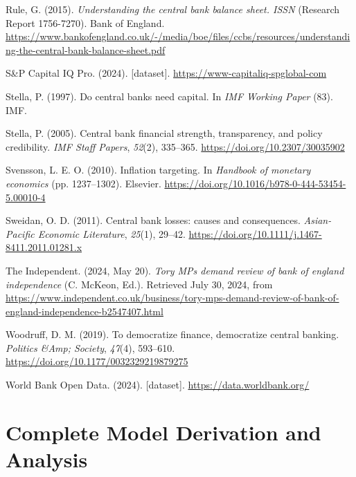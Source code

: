 \documentclass[
  a4paper,
  abstract=true]{scrartcl}
\newlength{\cslhangindent}
\newenvironment{CSLReferences}[2] %
 {\begin{list}{}{%
  \setlength{\itemindent}{0pt}
  \setlength{\leftmargin}{0pt}
  \setlength{\parsep}{0pt}
  \ifodd #1
   \setlength{\leftmargin}{\cslhangindent}
   \setlength{\itemindent}{-1\cslhangindent}
  \fi
  \setlength{\itemsep}{#2\baselineskip}}}
 {\end{list}}
\theoremstyle{definition}
\begin{document}
\begin{CSLReferences}{1}{0}
Rule, G. (2015). \emph{Understanding the central bank balance sheet.
ISSN} (Research Report 1756-7270). Bank of England.
\url{https://www.bankofengland.co.uk/-/media/boe/files/ccbs/resources/understanding-the-central-bank-balance-sheet.pdf}

S\&P Capital IQ Pro. (2024). {[}dataset{]}.
\url{https://www-capitaliq-spglobal-com}

Stella, P. (1997). Do central banks need capital. In \emph{IMF Working
Paper} (83). IMF.

Stella, P. (2005). Central bank financial strength, transparency, and
policy credibility. \emph{IMF Staff Papers}, \emph{52}(2), 335--365.
\url{https://doi.org/10.2307/30035902}

Svensson, L. E. O. (2010). Inflation targeting. In \emph{Handbook of
monetary economics} (pp. 1237--1302). Elsevier.
\url{https://doi.org/10.1016/b978-0-444-53454-5.00010-4}

Sweidan, O. D. (2011). Central bank losses: causes and consequences.
\emph{Asian-Pacific Economic Literature}, \emph{25}(1), 29--42.
\url{https://doi.org/10.1111/j.1467-8411.2011.01281.x}

The Independent. (2024, May 20). \emph{Tory MPs demand review of bank of
england independence} (C. McKeon, Ed.). Retrieved July 30, 2024, from
\url{https://www.independent.co.uk/business/tory-mps-demand-review-of-bank-of-england-independence-b2547407.html}

Woodruff, D. M. (2019). To democratize finance, democratize central
banking. \emph{Politics \&Amp; Society}, \emph{47}(4), 593--610.
\url{https://doi.org/10.1177/0032329219879275}

World Bank Open Data. (2024). {[}dataset{]}.
\url{https://data.worldbank.org/}

\end{CSLReferences}

\appendix
\newpage

\section{Complete Model Derivation and Analysis}\label{sec-model-app}
\end{document}
